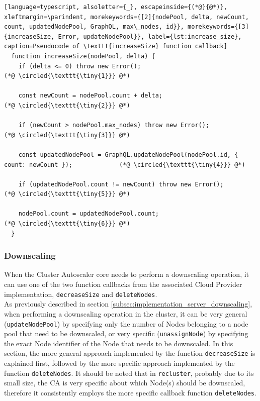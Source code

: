 \begin{lstlisting}[language=typescript, alsoletter={_}, escapeinside={(*@}{@*)}, xleftmargin=\parindent, morekeywords={[2]{nodePool, delta, newCount, count, updatedNodePool, GraphQL, max\_nodes, id}}, morekeywords={[3]{increaseSize, Error, updateNodePool}}, label={lst:increase_size}, caption=Pseudocode of \texttt{increaseSize} function callback]
  function increaseSize(nodePool, delta) {
    if (delta <= 0) throw new Error();                                                            (*@ \circled{\texttt{\tiny{1}}} @*)

    const newCount = nodePool.count + delta;                                                      (*@ \circled{\texttt{\tiny{2}}} @*)

    if (newCount > nodePool.max_nodes) throw new Error();                                         (*@ \circled{\texttt{\tiny{3}}} @*)

    const updatedNodePool = GraphQL.updateNodePool(nodePool.id, { count: newCount });             (*@ \circled{\texttt{\tiny{4}}} @*)

    if (updatedNodePool.count != newCount) throw new Error();                                     (*@ \circled{\texttt{\tiny{5}}} @*)

    nodePool.count = updatedNodePool.count;                                                       (*@ \circled{\texttt{\tiny{6}}} @*)
  }
\end{lstlisting}

\subsubsection{Downscaling}
\label{subsubsec:implementation_autoscaling_cluster_autoscaler_downscaling}

When the Cluster Autoscaler core needs to perform a downscaling operation, it
can use one of the two function callbacks from the associated Cloud Provider
implementation, \texttt{decreaseSize} and \texttt{deleteNodes}. \\ %
As previously described in section \ref{subsec:implementation_server_downscaling},
when performing a downscaling operation in the cluster, it can be very general (\texttt{updateNodePool})
by specifying only the number of Nodes belonging to a node pool that need to be
downscaled, or very specific (\texttt{unassignNode}) by specifying the exact
Node identifier of the Node that needs to be downscaled. In this section, the
more general approach implemented by the function \texttt{decreaseSize} is explained
first, followed by the more specific approach implemented by the function
\texttt{deleteNodes}. It should be noted that in \texttt{recluster}, probably
due to its small size, the CA is very specific about which Node(s) should be
downscaled, therefore it consistently employs the more specific callback function
\texttt{deleteNodes}. \\ %

